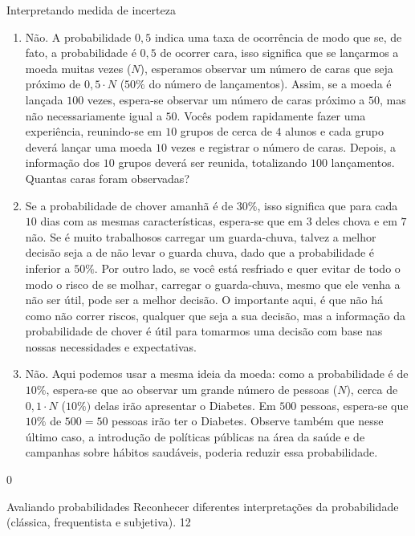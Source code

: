 \begin{answer}{Interpretando medida de incerteza}
{
\begin{enumerate}
\item Não. A probabilidade $0{,}5$ indica uma taxa de ocorrência de modo que se, de fato, a probabilidade é $0{,}5$ de ocorrer cara, isso significa que se lançarmos a moeda muitas vezes ($N$), esperamos observar um número de caras que seja próximo de $0{,}5\cdot N$ ($50\%$ do número de lançamentos). Assim, se a moeda é lançada $100$ vezes, espera-se observar um número de caras próximo a $50$, mas não necessariamente igual a $50$. Vocês podem rapidamente fazer uma experiência, reunindo-se em $10$ grupos de cerca de $4$ alunos e cada grupo deverá lançar uma moeda $10$ vezes e registrar o número de caras. Depois, a informação dos $10$ grupos deverá ser reunida, totalizando $100$ lançamentos. Quantas caras foram observadas?
\item Se a probabilidade de chover amanhã é de $30\%$, isso significa que para cada $10$ dias com as mesmas características, espera-se que em $3$ deles chova e em $7$ não. Se é muito trabalhosos carregar um guarda-chuva, talvez a melhor decisão seja a de não levar o guarda chuva, dado que a probabilidade é inferior a $50\%$. Por outro lado, se você está resfriado e quer evitar de todo o modo o risco de se molhar, carregar o guarda-chuva, mesmo que ele venha a não ser útil, pode ser a melhor decisão. O importante aqui, é que não há como não correr riscos, qualquer que seja a sua decisão, mas a informação da probabilidade de chover é útil para tomarmos uma decisão com base nas nossas necessidades e expectativas.
\item Não. Aqui podemos usar a mesma ideia da moeda: como a probabilidade é de $10\%$, espera-se que ao observar um grande número de pessoas ($N$), cerca de $0{,}1\cdot N$ ($10\%)$ delas irão apresentar o Diabetes. Em $500$ pessoas, espera-se que $10\%$ de $500=50$ pessoas irão ter o Diabetes. Observe também que nesse último caso, a introdução de políticas públicas na área da saúde e de campanhas sobre hábitos saudáveis, poderia reduzir essa probabilidade.
\end{enumerate}
}{0}
\end{answer}
\clearmargin
\begin{objectives}{Avaliando probabilidades}
{
Reconhecer diferentes interpretações da probabilidade (clássica, frequentista e subjetiva).
}{1}{2}
\end{objectives}
